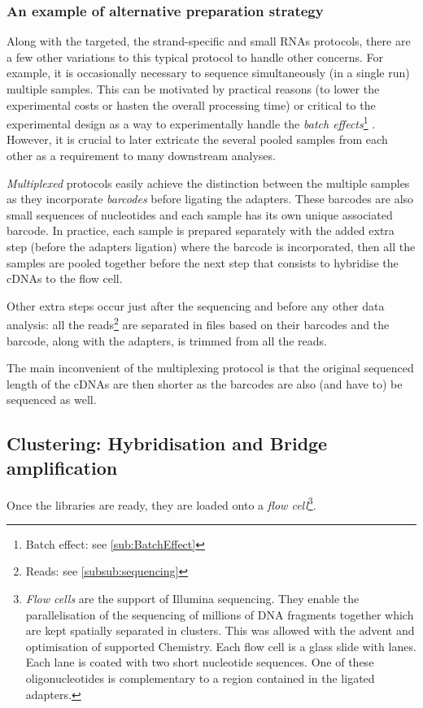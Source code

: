\subsubsection{An example of alternative preparation strategy}
Along with the targeted, the strand-specific and small \glspl{RNA} protocols,
there are a few other variations to this typical protocol to handle other concerns.
For example, it is occasionally necessary to sequence simultaneously (in a single
run) multiple samples. This can be motivated by practical reasons
(to lower the experimental costs or hasten the overall processing time)
 or critical to the experimental design as a way to
experimentally handle the \emph{batch effects}\footnote{Batch effect: see
\cref{sub:BatchEffect}} . However, it is
crucial to later extricate the several pooled samples from each other as a
requirement to many downstream analyses.

\emph{Multiplexed} protocols easily achieve
the distinction between the multiple samples as they incorporate \emph{barcodes}
before ligating the adapters. These barcodes are also small sequences of
nucleotides and each sample has its own unique associated
barcode. In practice, each sample is prepared separately with the added extra
step (before the adapters ligation) where the barcode is incorporated, then all
the samples are pooled together before the next step that consists to hybridise
the \glspl{cDNA} to the flow cell.

Other extra steps occur just after the sequencing and before any other data
analysis: all the reads\footnote{Reads: see \cref{subsub:sequencing}} are
separated in files based on their barcodes and the barcode, along with the
adapters, is trimmed from all the reads.

The main inconvenient of the multiplexing protocol is that the original sequenced
length of the \glspl{cDNA} are then shorter as the barcodes are also (and have
to) be sequenced as well.

\subsection[Clustering: Hybridisation and Bridge amplification]{Clustering:
Hybridisation and Bridge amplification }
\label{sub:HybridClustAmp}

Once the libraries are ready, they are loaded onto a \emph{flow cell}\footnote{%
\emph{Flow cells} are the support of Illumina sequencing. They enable the
parallelisation of the sequencing of millions of \gls{DNA} fragments together
which are kept spatially separated in clusters. This was allowed with the advent
and optimisation of supported Chemistry. Each flow cell is a glass slide with
lanes. Each lane is coated with two short nucleotide sequences. One of these
oligonucleotides is complementary to a region contained in the ligated adapters.}.

